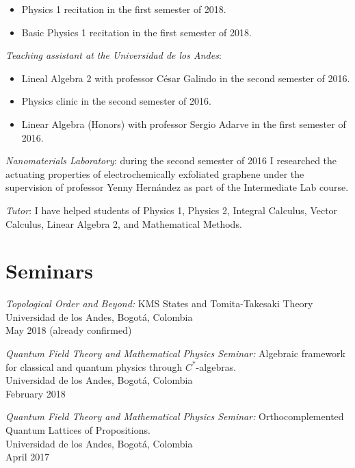 \documentclass[line,margin]{res}
\begin{document}
\begin{resume}
\begin{itemize}
\item Physics 1 recitation in the first semester of 2018.

\item Basic Physics 1 recitation in the first semester of 2018.

\end{itemize}

{\sl Teaching assistant at the Universidad de los Andes}: 
\begin{itemize}

\item Lineal Algebra 2 with professor César Galindo in the second semester of 2016.

\item Physics clinic in the second semester of 2016.

\item Linear Algebra (Honors) with professor Sergio Adarve in the first semester of 2016.

\end{itemize}

{\sl Nanomaterials Laboratory}: during the second semester of 2016 I researched the actuating properties of electrochemically exfoliated graphene under the supervision of professor Yenny Hernández as part of the Intermediate Lab course.
  
{\sl Tutor}: I have helped students of Physics 1, Physics 2, Integral Calculus, Vector Calculus, Linear Algebra 2, and Mathematical Methods.

\section{Seminars}

{\sl Topological Order and Beyond:} KMS States and Tomita-Takesaki Theory\\
Universidad de los Andes, Bogotá, Colombia\\
May 2018 (already confirmed)  

{\sl Quantum Field Theory and Mathematical Physics Seminar:} Algebraic framework for classical and quantum physics through $C^*$-algebras.\\
Universidad de los Andes, Bogotá, Colombia\\
February 2018

{\sl Quantum Field Theory and Mathematical Physics Seminar:} Orthocomplemented Quantum Lattices of Propositions.\\
Universidad de los Andes, Bogotá, Colombia\\
April 2017


\end{resume}
\end{document}
